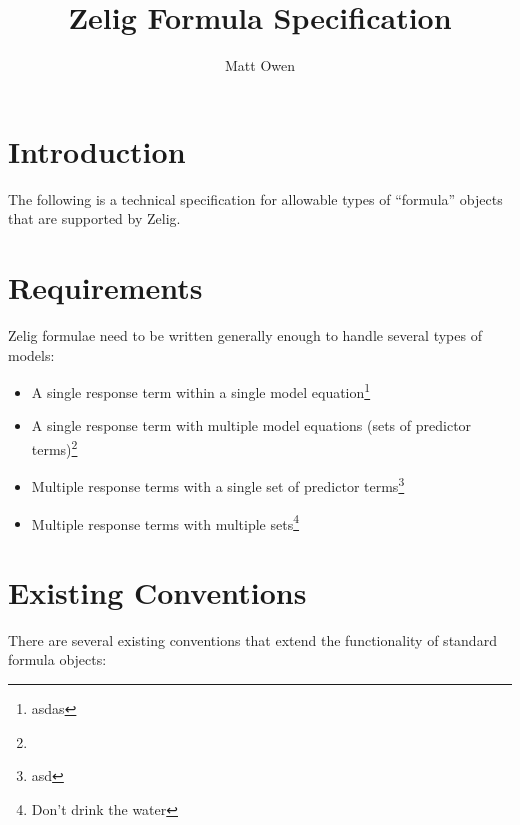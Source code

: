 \documentclass{article}
\title{Zelig Formula Specification}
\author{Matt Owen}
\begin{document}
\maketitle

\section{Introduction}

The following is a technical specification for allowable types of ``formula''
objects that are supported by Zelig.



\section{Requirements}

Zelig formulae need to be written generally enough to handle several types of
models:

\begin{itemize}

  \item A single response term within a single model equation\footnote{asdas}

  \item A single response term with multiple model equations (sets of predictor
    terms)\footnote{}

  \item Multiple response terms with a single set of predictor terms\footnote{asd}

  \item Multiple response terms with multiple sets\footnote{Don't drink the water}

\end{itemize}



\section{Existing Conventions}

There are several existing conventions that extend the functionality of standard
formula objects:
\end{document}
